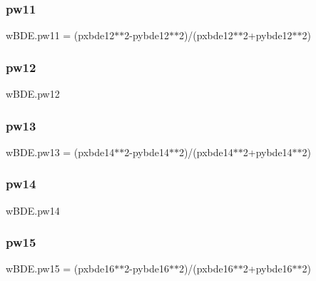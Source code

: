 \subsubsection{\texorpdfstring{pw11}{pw11}}
{\footnotesize\ttfamily w\+B\+D\+E.\+pw11 = (pxbde12$\ast$$\ast$2-\/pybde12$\ast$$\ast$2)/(pxbde12$\ast$$\ast$2+pybde12$\ast$$\ast$2)}

\mbox{\label{namespacewBDE_a2dbdaa5ff26b921e6acf4619af84aaa1}} 
\subsubsection{\texorpdfstring{pw12}{pw12}}
{\footnotesize\ttfamily w\+B\+D\+E.\+pw12}

\mbox{\label{namespacewBDE_a2cb987293c2c4e421b77b0fd3e73fcdd}} 
\subsubsection{\texorpdfstring{pw13}{pw13}}
{\footnotesize\ttfamily w\+B\+D\+E.\+pw13 = (pxbde14$\ast$$\ast$2-\/pybde14$\ast$$\ast$2)/(pxbde14$\ast$$\ast$2+pybde14$\ast$$\ast$2)}

\mbox{\label{namespacewBDE_a56c818d9fb4079d9c931d86f1e5cca26}} 
\subsubsection{\texorpdfstring{pw14}{pw14}}
{\footnotesize\ttfamily w\+B\+D\+E.\+pw14}

\mbox{\label{namespacewBDE_a7ce3a81ee30a26faabbcf4f332990938}} 
\subsubsection{\texorpdfstring{pw15}{pw15}}
{\footnotesize\ttfamily w\+B\+D\+E.\+pw15 = (pxbde16$\ast$$\ast$2-\/pybde16$\ast$$\ast$2)/(pxbde16$\ast$$\ast$2+pybde16$\ast$$\ast$2)}

\mbox{\label{namespacewBDE_a7ea4042a7bd7c90d85664d7dfeac15fb}} 
